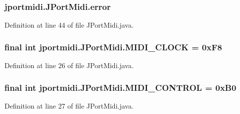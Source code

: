 \subsubsection[{\texorpdfstring{error}{error}}]{ jportmidi.\+J\+Port\+Midi.\+error}\hypertarget{classjportmidi_1_1_j_port_midi_a32a85b5d37a27533631760d985e59c38}{}\label{classjportmidi_1_1_j_port_midi_a32a85b5d37a27533631760d985e59c38}


Definition at line 44 of file J\+Port\+Midi.\+java.

\subsubsection[{\texorpdfstring{M\+I\+D\+I\+\_\+\+C\+L\+O\+CK}{MIDI_CLOCK}}]{\setlength{\rightskip}{0pt plus 5cm}final {\bf int} jportmidi.\+J\+Port\+Midi.\+M\+I\+D\+I\+\_\+\+C\+L\+O\+CK = 0x\+F8}\hypertarget{classjportmidi_1_1_j_port_midi_a76c00165bc7fdca007358e64a00dcd91}{}\label{classjportmidi_1_1_j_port_midi_a76c00165bc7fdca007358e64a00dcd91}


Definition at line 26 of file J\+Port\+Midi.\+java.

\subsubsection[{\texorpdfstring{M\+I\+D\+I\+\_\+\+C\+O\+N\+T\+R\+OL}{MIDI_CONTROL}}]{\setlength{\rightskip}{0pt plus 5cm}final {\bf int} jportmidi.\+J\+Port\+Midi.\+M\+I\+D\+I\+\_\+\+C\+O\+N\+T\+R\+OL = 0x\+B0}\hypertarget{classjportmidi_1_1_j_port_midi_ae72c06e21053d84decb79bf21679da58}{}\label{classjportmidi_1_1_j_port_midi_ae72c06e21053d84decb79bf21679da58}


Definition at line 27 of file J\+Port\+Midi.\+java.


